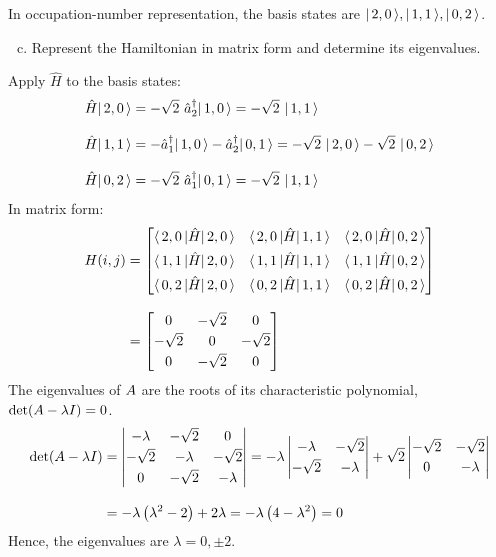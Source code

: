 In occupation-number representation, the basis states are $ \lvert\,2, 0\,\rangle, \lvert\,1,
    1\,\rangle, \lvert\,0, 2\,\rangle $.

\begin{enumerate}[(a)]
  \setcounter{enumi}{2}
  \item Represent the Hamiltonian in matrix form and determine its eigenvalues.
\end{enumerate}
Apply $\hat{H}$ to the basis states:
\begin{align*}
  \hat{H} \lvert\,2, 0\,\rangle
   & =
  - \sqrt{2}\ \hat{a}^{\dagger}_{2}\lvert\,1, 0\,\rangle
  =
  - \sqrt{2}\ \lvert\,1, 1\,\rangle
  \\[2ex]
  \hat{H} \lvert\,1, 1\,\rangle
   & =
  - \hat{a}^{\dagger}_{1}\lvert\,1, 0\,\rangle - \hat{a}^{\dagger}_{2}\lvert\,0, 1\,\rangle
  =
  - \sqrt{2}\ \lvert\,2, 0\,\rangle - \sqrt{2}\ \lvert\,0, 2\,\rangle
  \\[2ex]
  \hat{H} \lvert\,0, 2\,\rangle
   & =
  - \sqrt{2}\ \hat{a}^{\dagger}_{1}\lvert\,0, 1\,\rangle
  =
  - \sqrt{2}\ \lvert\,1, 1\,\rangle
\end{align*}
In matrix form:
\begin{align*}
  H(i, j)
   & =
  \begin{bmatrix}
    \langle\,2, 0\,\rvert \hat{H} \lvert\,2, 0\,\rangle & \langle\,2, 0\,\rvert \hat{H} \lvert\,1, 1\,\rangle & \langle\,2, 0\,\rvert \hat{H} \lvert\,0, 2\,\rangle
    \\[1ex]
    \langle\,1, 1\,\rvert \hat{H} \lvert\,2, 0\,\rangle & \langle\,1, 1\,\rvert \hat{H} \lvert\,1, 1\,\rangle & \langle\,1, 1\,\rvert \hat{H} \lvert\,0, 2\,\rangle
    \\[1ex]
    \langle\,0, 2\,\rvert \hat{H} \lvert\,2, 0\,\rangle & \langle\,0, 2\,\rvert \hat{H} \lvert\,1, 1\,\rangle & \langle\,0, 2\,\rvert \hat{H} \lvert\,0, 2\,\rangle
  \end{bmatrix}
  \\[2ex]
   & =
  \begin{bmatrix}
    0         & -\sqrt{2} & 0
    \\[0.5ex]
    -\sqrt{2} & 0         & -\sqrt{2}
    \\[0.5ex]
    0         & -\sqrt{2} & 0
  \end{bmatrix}
\end{align*}
The eigenvalues of ${A}$ are the roots of its characteristic polynomial,
$\det({A} - \lambda {I}) = 0$.
\begin{align*}
  \det({A} - \lambda {I})
   & =
  \begin{vmatrix}
    -\lambda  & -\sqrt{2} & 0
    \\[0.5ex]
    -\sqrt{2} & -\lambda  & -\sqrt{2}
    \\[0.5ex]
    0         & -\sqrt{2} & -\lambda
  \end{vmatrix}
  =
  -\lambda
  \begin{vmatrix}
    -\lambda  & -\sqrt{2}
    \\[0.5ex]
    -\sqrt{2} & -\lambda
  \end{vmatrix}
  + \sqrt{2}
  \begin{vmatrix}
    -\sqrt{2} & -\sqrt{2}
    \\[0.5ex]
    0         & -\lambda
  \end{vmatrix}
  \\[2ex]
   & =
  -\lambda \left( \lambda^2 - 2 \right) + 2 \lambda
  =
  -\lambda \left( 4 - \lambda^2 \right) = 0
\end{align*}
Hence, the eigenvalues are $\lambda = 0, \pm 2$.
